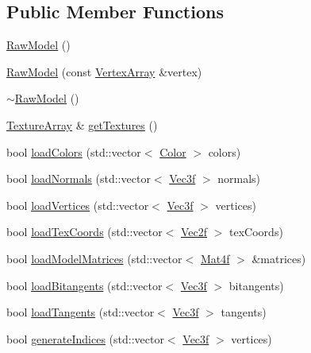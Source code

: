 \subsection*{Public Member Functions}
\begin{DoxyCompactItemize}
\item 
\hyperlink{classpcs_1_1RawModel_a79a06ab99e5e7438ad61c68601e9e7ea}{Raw\+Model} ()
\item 
\hyperlink{classpcs_1_1RawModel_addb04fed9a364e9c24b8b4f4b69480a7}{Raw\+Model} (const \hyperlink{classpcs_1_1VertexArray}{Vertex\+Array} \&vertex)
\item 
\hyperlink{classpcs_1_1RawModel_a3fb7c140b100311f737d23dfb9fbf6d6}{$\sim$\+Raw\+Model} ()
\item 
\hyperlink{unionpcs_1_1TextureArray}{Texture\+Array} \& \hyperlink{classpcs_1_1RawModel_a3caaf1aa1419660fcd4c33807eb96782}{get\+Textures} ()
\item 
bool \hyperlink{classpcs_1_1RawModel_ae62c8b9e99a8d83c79338b86bd857f0d}{load\+Colors} (std\+::vector$<$ \hyperlink{structpcs_1_1Color}{Color} $>$ colors)
\item 
bool \hyperlink{classpcs_1_1RawModel_add81afbd701da03693bbb45921425b9f}{load\+Normals} (std\+::vector$<$ \hyperlink{namespacepcs_a68e0f517680976c17c810ffe6952cbab}{Vec3f} $>$ normals)
\item 
bool \hyperlink{classpcs_1_1RawModel_ac87cd0d4a1bd6d587b9e680f02a810c3}{load\+Vertices} (std\+::vector$<$ \hyperlink{namespacepcs_a68e0f517680976c17c810ffe6952cbab}{Vec3f} $>$ vertices)
\item 
bool \hyperlink{classpcs_1_1RawModel_af33dad372a9f74e01ef8412e805d99cf}{load\+Tex\+Coords} (std\+::vector$<$ \hyperlink{namespacepcs_a4b2fd718bd0800b6aa492b1c60f19edc}{Vec2f} $>$ tex\+Coords)
\item 
bool \hyperlink{classpcs_1_1RawModel_acf35bf470e0ca38f98a53a7db7fa0a3b}{load\+Model\+Matrices} (std\+::vector$<$ \hyperlink{structpcs_1_1Mat4f}{Mat4f} $>$ \&matrices)
\item 
bool \hyperlink{classpcs_1_1RawModel_a64c1634cbeb22fc4b087f24cac6ba242}{load\+Bitangents} (std\+::vector$<$ \hyperlink{namespacepcs_a68e0f517680976c17c810ffe6952cbab}{Vec3f} $>$ bitangents)
\item 
bool \hyperlink{classpcs_1_1RawModel_ad1f5e752490cbba94a639b49cbd08c93}{load\+Tangents} (std\+::vector$<$ \hyperlink{namespacepcs_a68e0f517680976c17c810ffe6952cbab}{Vec3f} $>$ tangents)
\item 
bool \hyperlink{classpcs_1_1RawModel_a147fb1b196e18e2f2deb1a6e86fff9b6}{generate\+Indices} (std\+::vector$<$ \hyperlink{namespacepcs_a68e0f517680976c17c810ffe6952cbab}{Vec3f} $>$ vertices)
\end{DoxyCompactItemize}
